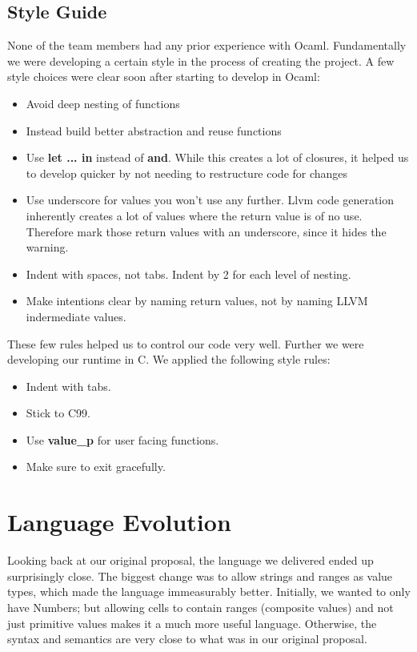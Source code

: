 \subsection{Style Guide}
  None of the team members had any prior experience with Ocaml. Fundamentally we were developing a certain style in the process of creating the project. A few style choices were clear soon after starting to develop in Ocaml:
  \begin{itemize}
  \item Avoid deep nesting of functions
  \item Instead build better abstraction and reuse functions
  \item Use \textbf{let ... in} instead of \textbf{and}. While this creates a lot of closures, it helped us to develop quicker by not needing to restructure code for changes
  \item Use underscore for values you won't use any further. Llvm code generation inherently creates a lot of values where the return value is of no use. Therefore mark those return values with an underscore, since it hides the warning.
  \item Indent with spaces, not tabs. Indent by 2 for each level of nesting.
  \item Make intentions clear by naming return values, not by naming LLVM indermediate values.
  \end{itemize}
These few rules helped us to control our code very well.\newline
Further we were developing our runtime in C. We applied the following style rules:
  \begin{itemize}
  \item Indent with tabs.
  \item Stick to C99.
  \item Use \textbf{value\_p} for user facing functions.
  \item Make sure to exit gracefully.
  \end{itemize}

\section{Language Evolution}
Looking back at our original proposal, the language we delivered ended up surprisingly close. The biggest change was to allow strings and ranges as value types, which made the language immeasurably better. Initially, we wanted to only have Numbers; but allowing cells to contain ranges (composite values) and not just primitive values makes it a much more useful language. Otherwise, the syntax and semantics are very close to what was in our original proposal.

